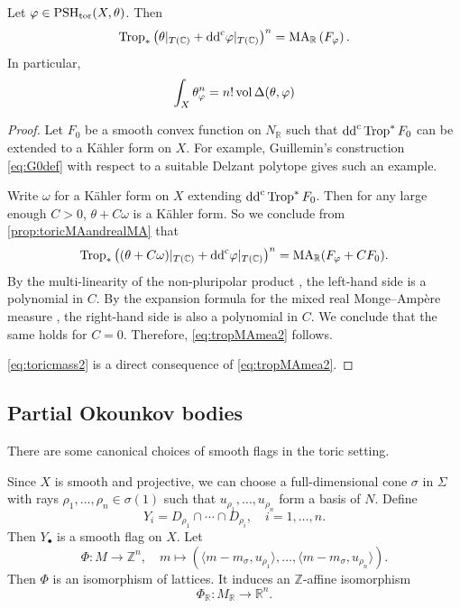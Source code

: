 \begin{proposition}\label{prop:toricMAandrealMA2}
    Let $\varphi\in \mathrm{PSH}_{\mathrm{tor}}(X,\theta)$. Then
    \begin{equation}\label{eq:tropMAmea2}
    \operatorname{Trop}_* \left(\theta|_{T(\mathbb{C})}+\mathrm{dd}^{\mathrm{c}}\varphi|_{T(\mathbb{C})} \right)^n=\operatorname{MA}_{\mathbb{R}}\left(F_{\varphi}\right).
    \end{equation}
    In particular,
    \begin{equation}\label{eq:toricmass2}
        \int_X \theta_{\varphi}^n =n! \operatorname{vol} \Delta(\theta,\varphi)
    \end{equation}
\end{proposition}
\begin{proof}
    Let $F_0$ be a smooth convex function on $N_{\mathbb{R}}$ such that $\mathrm{dd}^{\mathrm{c}} \operatorname{Trop}^* F_0$ can be extended to a K\"ahler form on $X$. For example, Guillemin's construction \eqref{eq:G0def} with respect to a suitable Delzant polytope gives such an example.


    Write $\omega$ for a Kähler form on $X$ extending $\mathrm{dd}^{\mathrm{c}}\operatorname{Trop}^*F_0$. Then for any large enough $C>0$, $\theta+C\omega$ is a Kähler form. So we conclude from \cref{prop:toricMAandrealMA} that
    \[
    \operatorname{Trop}_* \left((\theta+C\omega)|_{T(\mathbb{C})}+\mathrm{dd}^{\mathrm{c}}\varphi|_{T(\mathbb{C})} \right)^n=\operatorname{MA}_{\mathbb{R}}(F_{\varphi}+CF_0).
    \]
    By the multi-linearity of the non-pluripolar product , the left-hand side is a polynomial in $C$. By the expansion formula for the mixed real Monge--Amp\`ere measure , the right-hand side is also a polynomial in $C$. We conclude that the same holds for $C=0$. Therefore, \eqref{eq:tropMAmea2} follows.

    \eqref{eq:toricmass2} is a direct consequence of \eqref{eq:tropMAmea2}.
\end{proof}


\subsection{Partial Okounkov bodies}\label{subsec:pobtorgeneral}


There are some canonical choices of smooth flags in the toric setting.

Since $X$ is smooth and projective, we can choose a full-dimensional cone $\sigma$ in $\Sigma$ with rays $\rho_1,\ldots,\rho_n\in \sigma(1)$ such that $u_{\rho_1},\ldots,u_{\rho_n}$ form a basis of $N$. Define
\[
Y_i=D_{\rho_1}\cap\cdots\cap D_{\rho_i},\quad i=1,\ldots,n.
\]
Then $Y_{\bullet}$ is a smooth flag on $X$. Let
\begin{equation}\label{eq:isoMZncanonical}
\Phi\colon M\rightarrow \mathbb{Z}^n,\quad m\mapsto \left(\langle m-m_{\sigma},u_{\rho_1} \rangle,\dots,\langle m-m_{\sigma},u_{\rho_n} \rangle \right).
\end{equation}
Then $\Phi$ is an isomorphism of lattices.
It induces an $\mathbb{Z}$-affine isomorphism
\[
\Phi_{\mathbb{R}}\colon M_{\mathbb{R}}\rightarrow \mathbb{R}^n.
\]


